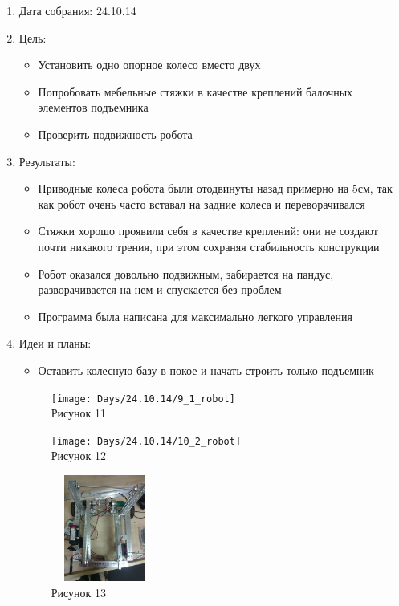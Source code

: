 
	\begin{enumerate}
		\item Дата собрания: 24.10.14
		\item Цель:
		\begin{itemize}
			\item Установить одно опорное колесо вместо двух
			\item Попробовать мебельные стяжки в качестве креплений балочных элементов подъемника
			\item Проверить подвижность робота
		\end{itemize}			
		\item Результаты:
		\begin{itemize}
			\item Приводные колеса робота были отодвинуты назад примерно на 5см, так как робот очень часто вставал на задние колеса и переворачивался
			\item Стяжки хорошо проявили себя в качестве креплений: они не создают почти никакого трения, при этом сохраняя стабильность конструкции
			\item Робот оказался довольно подвижным, забирается на пандус, разворачивается на нем и спускается без проблем
			\item Программа была написана для максимально легкого управления
		\end{itemize}
		\item Идеи и планы:
		\begin{itemize}
			\item Оставить колесную базу в покое и начать строить только подъемник
		\end{itemize}
		\begin{figure} [h]
			\centering
			\begin{minipage}{0.3\linewidth}
				\texttt{[image: Days/24.10.14/9\_1\_robot]}\\ Рисунок 11
			\end{minipage}
			\begin{minipage}{0.3\linewidth}
				\texttt{[image: Days/24.10.14/10\_2\_robot]}\\ Рисунок 12
			\end{minipage}
			\begin{minipage}{0.3\linewidth}
				\includegraphics[width=35mm,height=35mm]{Days/24.10.14/9_4_robot}\\ Рисунок 13
			\end{minipage}
		\end{figure}
	\end{enumerate}
\fillpage
\newpage